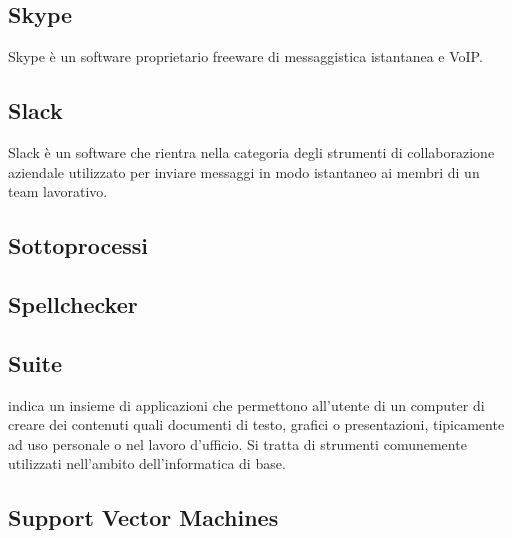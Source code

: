 
\subsection*{Skype}
Skype è un software proprietario freeware di messaggistica istantanea e VoIP.

\subsection*{Slack}
Slack è un software che rientra nella categoria degli strumenti di collaborazione aziendale utilizzato per inviare messaggi in modo istantaneo ai membri di un team lavorativo.

\subsection*{Sottoprocessi}

\subsection*{Spellchecker}

\subsection*{Suite}
indica un insieme di applicazioni che permettono all'utente di un computer di creare dei contenuti quali documenti di testo, grafici o presentazioni, tipicamente ad uso personale o nel lavoro d'ufficio. 
Si tratta di strumenti comunemente utilizzati nell'ambito dell'informatica di base.

\subsection*{Support Vector Machines}

